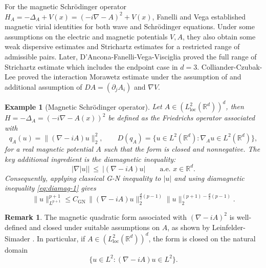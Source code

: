 \documentclass[10pt%
]{amsart}
\numberwithin{equation}{section}
\newtheorem{example}{Example}[section]
\newcommand{\R}{\mathbb{R}}
\theoremstyle{definition}
\newtheorem{remark}[theorem]{Remark}
\begin{document}
	For the magnetic Schr\"odinger operator $H_A=-\Delta_A+V(x)=(-i\nabla-A)^2+V(x)$, Fanelli and Vega \cite{Fanelli-Vega} established magnetic virial identities for both wave and Schr\"odinger equations. Under some assumptions on the electric and magnetic potentials $V,A$, they also obtain some weak dispersive estimates and Strichartz estimates for a restricted range of admissible pairs. Later, D'Ancona-Fanelli-Vega-Visciglia \cite{DFVV-endpoint} proved the full range of Strichartz estimate which includes the endpoint case in $d=3$. Colliander-Czubak-Lee \cite{CCL} proved the interaction Morawetz estimate under the assumption of \cite{Fanelli-Vega} and additional assumption of $DA=(\partial_jA_i)$ and $\nabla V$.
	\begin{example}[Magnetic Schr\"odinger operator]Let $A\in (L_{\operatorname{loc}}^2(\R^d))^d$, then
		$H=-\Delta_A=(-i\nabla-A(x))^2$ be defined as the Friedrichs operator associated with
		\[
				q_A(u)=\|(\nabla-iA)u\|_2^2,\qquad D(q_A)=\{u\in L^2(\mathbb R^d):\nabla_Au\in L^2(\mathbb R^d)\},
				\]
		for a real magnetic potential $ A$ such that the form is closed and nonnegative.
		The key additional ingredient is the diamagnetic inequality:
		\begin{equation}\label{eq:diamag-1}
			|\nabla |u||\ \le\ |(\nabla-i A)u|\qquad \text{a.e. }x\in\R^d.
		\end{equation}
		Consequently, applying classical G-N inequality to $|u|$ and using diamagnetic inequality \eqref{eq:diamag-1} gives
		\[
		\|u\|_{L^{p+1}}^{p+1}
		\le
		C_{\mathrm{GN}}\,
		\|(\nabla-i A)u\|_2^{\frac{d}{2}(p-1)}\|u\|_2^{(p+1)-\frac{d}{2}(p-1)}.
		\]
	\end{example}
	\begin{remark}
				The magnetic quadratic form associated with $(\nabla - iA)^2$ is well-defined
				and closed under suitable assumptions on $A$, as shown by Leinfelder-Simader \cite{Leinfelder}.
				In particular, if $A \in (L^2_{\mathrm{loc}}(\mathbb{R}^d))^d$, the form is closed
				on the natural domain
				\[
				\{u \in L^2 : (\nabla - iA)u \in L^2\}.
				\]
	\end{remark}
	
	
	
\end{document}
